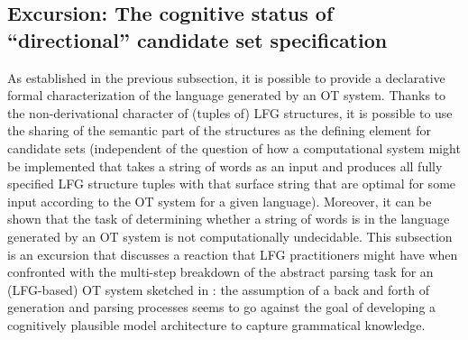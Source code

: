\documentclass[output=paper,hidelinks]{langscibook}
\begin{document}
\subsection{Excursion: The cognitive status of ``directional'' candidate set specification}
\label{sec:OT:psycho-real}

As established in the previous subsection, it is possible to provide
a declarative formal characterization of the language generated by an OT system. Thanks to the non-derivational character of (tuples of) LFG structures, it is possible to use the sharing of the semantic part of the structures as the defining element for candidate sets (independent of the question of how a computational system might be implemented that takes a string of words as an input and produces all fully specified LFG structure tuples with that surface string that are optimal for some input according to the OT system for a given language). Moreover, it can be shown that the task of determining whether a string of words is in the language generated by an OT system is not computationally undecidable.
This subsection is an excursion that discusses a reaction that LFG practitioners might have when confronted with the multi-step breakdown of the abstract parsing task for an (LFG-based) OT system sketched in : the assumption of a back and forth of generation and parsing processes seems to go against the goal of developing a cognitively plausible model architecture to capture grammatical knowledge. 
\end{document}
